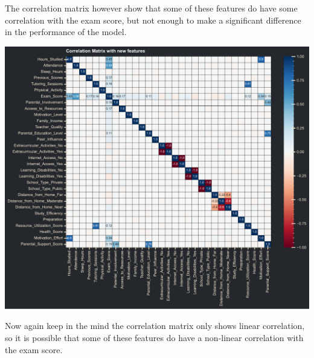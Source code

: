 \documentclass{assignment}
\begin{document}
The correlation matrix however show that some of these features do have some correlation with the exam score, but not enough to make a significant difference in the performance of the model. 
\begin{center}
    \includegraphics[width=5.5in]{../report/assets/correlation_matrix_new_features.pdf}
\end{center}
Now again keep in the mind the correlation matrix only shows linear correlation, so it is possible that some of these features do have a non-linear correlation with the exam score.
\end{document}
